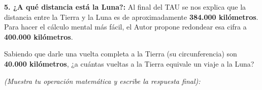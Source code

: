 \documentclass[12pt, letterpaper]{article}
\begin{document}
	\noindent \textbf{5. ¿A qué distancia está la Luna?:} Al final del TAU se nos explica que la distancia entre la Tierra y la Luna es de aproximadamente \textbf{384.000 kilómetros}. Para hacer el cálculo mental más fácil, el Autor propone redondear esa cifra a \textbf{400.000 kilómetros}. 
	
	\vspace{0.2cm}
	\noindent Sabiendo que darle una vuelta completa a la Tierra (su circunferencia) son \textbf{40.000 kilómetros}, ¿a cuántas vueltas a la Tierra equivale un viaje a la Luna?
	\vspace{0.1cm}
	
	\noindent \textit{(Muestra tu operación matemática y escribe la respuesta final):}
	\vspace{0.2cm}
	
	\begin{tcolorbox}[colframe=black, colback=white, height=3.5cm, width=0.8\textwidth]
	\end{tcolorbox}
	
\end{document}
